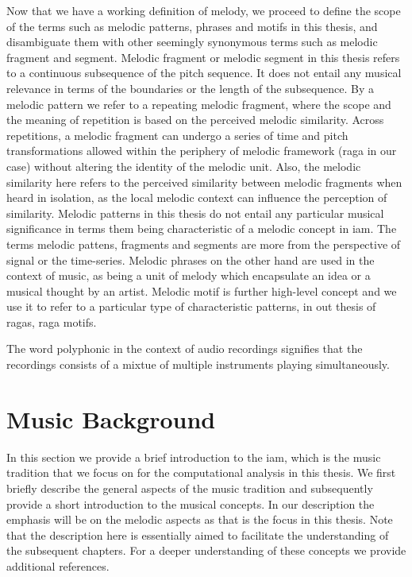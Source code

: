Now that we have a working definition of melody, we proceed to define the scope of the terms such as melodic patterns, phrases and motifs in this thesis, and disambiguate them with other seemingly synonymous terms such as melodic fragment and segment. Melodic fragment or melodic segment in this thesis refers to a continuous subsequence of the pitch sequence. It does not entail any musical relevance in terms of the boundaries or the length of the subsequence. By a melodic pattern we refer to a repeating melodic fragment, where the scope and the meaning of repetition is based on the perceived melodic similarity. Across repetitions, a melodic fragment can undergo a series of time and pitch transformations allowed within the periphery of melodic framework (\gls{raga} in our case) without altering the identity of the melodic unit. Also, the melodic similarity here refers to the perceived similarity between melodic fragments when heard in isolation, as the local melodic context can influence the perception of similarity. Melodic patterns in this thesis do not entail any particular musical significance in terms them being characteristic of a melodic concept in \gls{iam}. The terms melodic pattens, fragments and segments are more from the perspective of signal or the time-series. Melodic phrases on the other hand are used in the context of music, as being a unit of melody which encapsulate an idea or a musical thought by an artist. Melodic motif is further high-level concept and we use it to refer to a particular type of characteristic patterns, in out thesis of \glspl{raga}, \gls{raga} motifs. 


The word polyphonic in the context of audio recordings signifies that the recordings consists of a mixtue of multiple instruments playing simultaneously.


\section{Music Background}
\label{sec:music_background}

In this section we provide a brief introduction to the \gls{iam}, which is the music tradition that we focus on for the computational analysis in this thesis. We first briefly describe the general aspects of the  music tradition and subsequently provide a short introduction to the musical concepts. In our description the emphasis will be on the melodic aspects as that is the focus in this thesis. Note that the description here is essentially aimed to facilitate the understanding of the subsequent chapters. For a deeper understanding of these concepts we provide additional references. 

